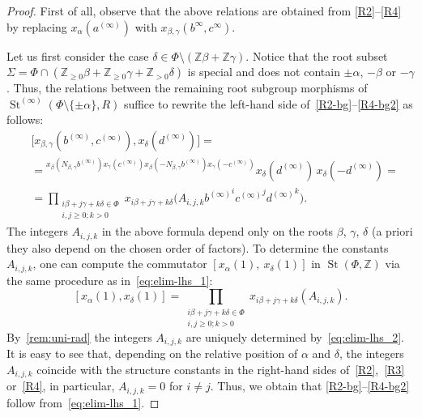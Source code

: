 \documentclass{article}
\numberwithin{equation}{section}
\theoremstyle{definition}
\theoremstyle{remark}
\DeclareMathOperator\St{St}
\newcommand{\ZZ}{\mathbb{Z}}
\newcommand{\up}[2]{{^{#1}\!{#2}}}
\begin{document}
\begin{proof}
 First of all, observe that the above relations are obtained from \eqref{R2}--\eqref{R4} by replacing $x_\alpha(a^{(\infty)})$ with $x_{\beta, \gamma}(b^{\infty}, c^{\infty})$.
 
 Let us first consider the case \(\delta \in \Phi \setminus (\ZZ \beta + \ZZ \gamma)\).
 Notice that the root subset $\Sigma = \Phi \cap (\ZZ_{\geq 0}\beta + \ZZ_{\geq 0}\gamma + \ZZ_{>0}\delta)$ is special and does not contain $\pm\alpha$, $-\beta$ or $-\gamma$. Thus, the relations between the remaining root subgroup morphisms of $\St^{(\infty)}(\Phi\setminus\{\pm\alpha\}, R)$ suffice to rewrite the left-hand side of~\eqref{R2-bg}--\eqref{R4-bg2} as follows:
 \begin{align}
  &\bigl[x_{\beta, \gamma}(b^{(\infty)}, c^{(\infty)}), x_\delta(d^{(\infty)})\bigr] = \label{eq:elim-lhs_1} \\
  &= \up{x_\beta(N_{\beta, \gamma} b^{(\infty)})
   x_\gamma(c^{(\infty)})
   x_\beta(-N_{\beta, \gamma} b^{(\infty)})
   x_\gamma(-c^{(\infty)})}
  {x_\delta(d^{(\infty)})}\,
  x_\delta(-d^{(\infty)}) = \nonumber \\
  &= \prod_{\substack{i\beta + j\gamma + k\delta \in \Phi\\ i, j \geq 0; k > 0}}
  x_{i\beta + j\gamma + k\delta} \bigl(A_{i, j, k} {b^{(\infty)}}^i {c^{(\infty)}}^j {d^{(\infty)}}^k\bigr). \nonumber
 \end{align}
 The integers \(A_{i, j, k}\) in the above formula depend only on the roots \(\beta\), \(\gamma\), \(\delta\) (a priori they also depend on the chosen order of factors). To determine the constants $A_{i,j,k}$, one can compute the commutator $[x_\alpha(1),\ x_\delta(1)]$ in $\St(\Phi, \ZZ)$ via the same procedure as in~\eqref{eq:elim-lhs_1}:
 \begin{equation} \label{eq:elim-lhs_2}
  [x_\alpha(1), x_\delta(1)] = \prod_{\substack{i\beta + j\gamma + k\delta \in \Phi\\ i, j \geq 0; k > 0}}
  x_{i\beta + j\gamma + k\delta}(A_{i, j, k}).
 \end{equation}
  By~\cref{rem:uni-rad} the integers $A_{i,j,k}$ are uniquely determined by~\eqref{eq:elim-lhs_2}.
  It is easy to see that, depending on the relative position of $\alpha$ and $\delta$, the integers $A_{i,j,k}$ coincide with the structure constants in the right-hand sides of~\eqref{R2},~\eqref{R3} or~\eqref{R4}, in particular, $A_{i,j,k}=0$ for $i\neq j$.
  Thus, we obtain that \eqref{R2-bg}--\eqref{R4-bg2} follow from~\eqref{eq:elim-lhs_1}.
 

\end{proof}
\end{document}
